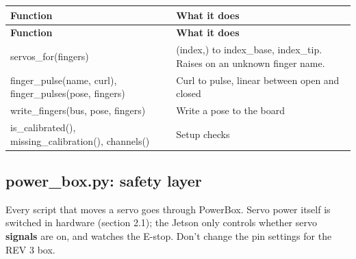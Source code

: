 \documentclass[11pt,letterpaper]{article}
\newcommand{\code}[1]{\textcolor{codeblue}{\ttfamily\smaller\relax #1}}
\begin{document}
{\small
\begin{longtable}{|>{\raggedright\arraybackslash}p{}|>{\raggedright\arraybackslash}p{}|}
\hline
\rowcolor{tblhead}\textbf{Function} & \textbf{What it does} \\ \hline
\endfirsthead
\hline
\rowcolor{tblhead}\textbf{Function} & \textbf{What it does} \\ \hline
\endhead
\code{servos\_\allowbreak{}for(fingers)} & \code{(\textquotedbl{}index\textquotedbl{},\allowbreak{})} to \code{index\_\allowbreak{}base}, \code{index\_\allowbreak{}tip}. Raises on an unknown finger name. \\ \hline
\code{finger\_\allowbreak{}pulse(name,\allowbreak{} curl)}, \code{finger\_\allowbreak{}pulses(pose,\allowbreak{} fingers)} & Curl to pulse, linear between open and closed \\ \hline
\code{write\_\allowbreak{}fingers(bus,\allowbreak{} pose,\allowbreak{} fingers)} & Write a pose to the board \\ \hline
\code{is\_\allowbreak{}calibrated()}, \code{missing\_\allowbreak{}calibration()}, \code{channels()} & Setup checks \\ \hline
\end{longtable}}


\subsection{power\_box.py: safety layer}
Every script that moves a servo goes through \code{PowerBox}. Servo power itself is switched in hardware (section 2.1); the Jetson only controls whether servo \textbf{signals} are on, and watches the E-stop. Don't change the pin settings for the REV 3 box.
\end{document}
